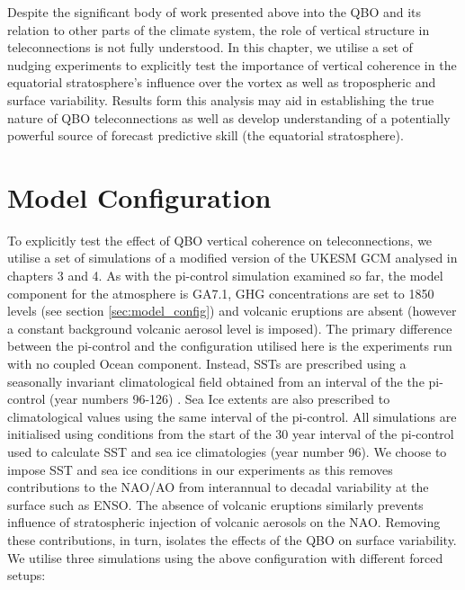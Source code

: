 Despite the significant body of work presented above into the QBO and its relation to other parts of the climate system, the role of vertical structure in teleconnections is not fully understood. In this chapter, we utilise a set of nudging experiments to explicitly test the importance of vertical coherence in the equatorial stratosphere's influence over the vortex as well as tropospheric and surface variability. Results form this analysis may aid in establishing the true nature of QBO teleconnections as well as develop understanding of a potentially powerful source of forecast predictive skill (the equatorial stratosphere).

\section{Model Configuration}

To explicitly test the effect of QBO vertical coherence on teleconnections, we utilise a set of simulations of a modified version of the UKESM GCM analysed in chapters 3 and 4. As with the pi-control simulation examined so far, the model component for the atmosphere is GA7.1, GHG concentrations are set to 1850 levels (see section \ref{sec:model_config}) and volcanic eruptions are absent (however a constant background volcanic aerosol level is imposed). The primary difference between the pi-control and the configuration utilised here is the experiments run with no coupled Ocean component. Instead, SSTs are prescribed using a seasonally invariant climatological field obtained from an interval of the the pi-control (year numbers 96-126) \cite{oconnorAssessment2021b}. Sea Ice extents are also prescribed to climatological values using the same interval of the pi-control. All simulations are initialised using conditions from the start of the 30 year interval of the pi-control used to calculate SST and sea ice climatologies (year number 96). We choose to impose SST and sea ice conditions in our experiments as this removes contributions to the NAO/AO from interannual to decadal variability at the surface such as ENSO. The absence of volcanic eruptions similarly prevents influence of stratospheric injection of volcanic aerosols on the NAO. Removing these contributions, in turn, isolates the effects of the QBO on surface variability. We utilise three simulations using the above configuration with different forced setups:

